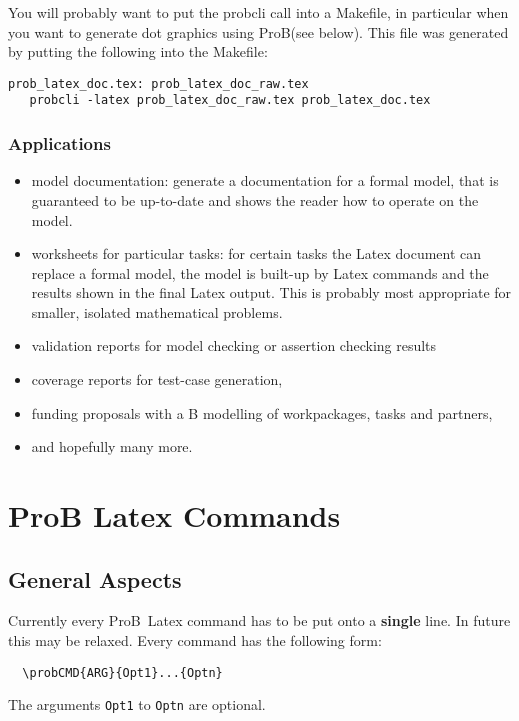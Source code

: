\documentclass[final]{llncs}
\newcommand{\prob}{{\sc ProB}}
\begin{document}
You will probably want to put the probcli call into a Makefile, in particular when you want
to generate dot graphics using \prob (see below).
This file was generated by putting the following into the Makefile:

\begin{verbatim}
prob_latex_doc.tex: prob_latex_doc_raw.tex
   probcli -latex prob_latex_doc_raw.tex prob_latex_doc.tex
\end{verbatim}

\subsubsection*{Applications}

\begin{itemize}
 \item model documentation: generate a documentation for a formal model, that is guaranteed
  to be up-to-date and shows the reader how to operate on the model.
 \item worksheets for particular tasks: for certain tasks the Latex document can replace
  a formal model, the model is built-up by Latex commands and the results shown in the
  final Latex output.
  This is probably most appropriate for smaller, isolated mathematical problems.
 \item validation reports for model checking or assertion checking results
 \item coverage reports for test-case generation,
 \item funding proposals with a B modelling of workpackages, tasks and partners,
 \item and hopefully many more.
\end{itemize} 


\section{ProB Latex Commands}

\subsection{General Aspects}

Currently every \prob\ Latex command has to be put onto a {\bf single} line.
In future this may be relaxed.
Every command has the following form:
\begin{verbatim}
  \probCMD{ARG}{Opt1}...{Optn}
\end{verbatim}
The arguments {\tt Opt1} to {\tt Optn} are optional.
\end{document}
